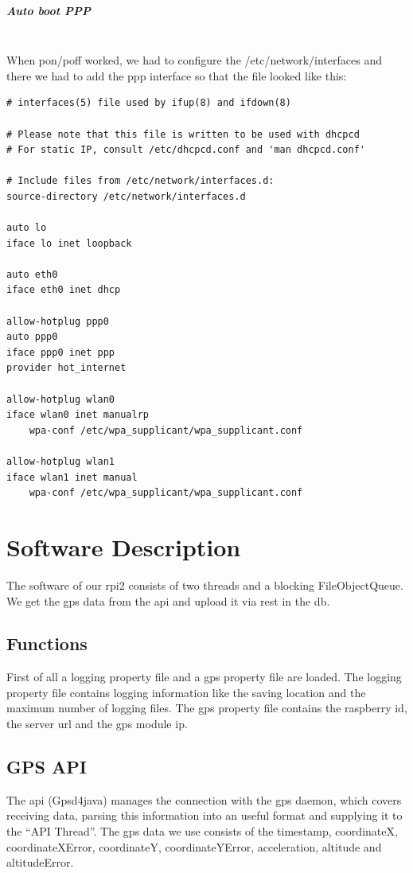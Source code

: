 \subparagraph{Auto boot PPP}\mbox{}\\
When pon/poff worked, we had to configure the /etc/network/interfaces and there we had to add the ppp interface so that the file looked like this:
\begin{verbatim}
# interfaces(5) file used by ifup(8) and ifdown(8)
 
# Please note that this file is written to be used with dhcpcd
# For static IP, consult /etc/dhcpcd.conf and 'man dhcpcd.conf'
 
# Include files from /etc/network/interfaces.d:
source-directory /etc/network/interfaces.d
 
auto lo
iface lo inet loopback
 
auto eth0
iface eth0 inet dhcp
 
allow-hotplug ppp0
auto ppp0
iface ppp0 inet ppp
provider hot_internet
 
allow-hotplug wlan0
iface wlan0 inet manualrp
    wpa-conf /etc/wpa_supplicant/wpa_supplicant.conf
 
allow-hotplug wlan1
iface wlan1 inet manual
    wpa-conf /etc/wpa_supplicant/wpa_supplicant.conf
\end{verbatim}

\newpage
\section{Software Description}
The software of our \gls{rpi2} consists of two threads and a blocking FileObjectQueue. We get the \gls{gps} data from the \gls{api} and upload it via \gls{rest} in the \gls{db}. 
\subsection{Functions}
First of all a logging property file and a gps property file are loaded. The logging property file contains logging information like the saving location and the maximum number of logging files. The gps property file contains the raspberry id, the server \gls{url} and the gps module \gls{ip}.
\subsection{GPS API}
The \gls{api} (Gpsd4java) manages the connection with the \gls{gps} daemon, which covers receiving data, parsing this information into an useful format and supplying it to the “API Thread”. The \gls{gps} data we use consists of the timestamp, coordinateX, coordinateXError, coordinateY, coordinateYError, acceleration, altitude and altitudeError.
